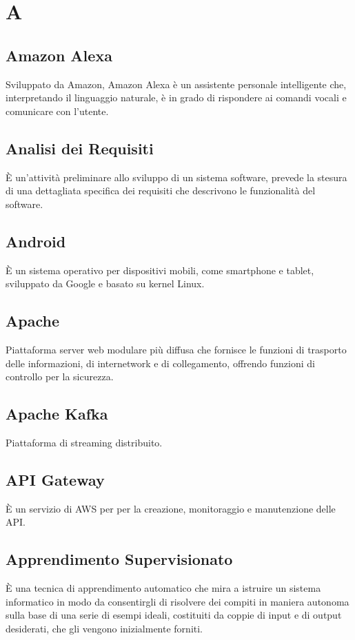 \section*{A}

\subsection{Amazon Alexa}
Sviluppato da Amazon, Amazon Alexa è un assistente personale intelligente che, interpretando il linguaggio naturale, è in grado di rispondere ai comandi vocali e comunicare con l'utente. 

\subsection{Analisi dei Requisiti}
È un'attività preliminare allo sviluppo di un sistema software, prevede la stesura di una dettagliata specifica dei requisiti che descrivono le funzionalità del software.

\subsection{Android}
È un sistema operativo per dispositivi mobili, come smartphone e tablet, sviluppato da Google e basato su kernel Linux.

\subsection{Apache}
Piattaforma server web modulare più diffusa che fornisce le funzioni di trasporto delle informazioni, di internetwork e di collegamento, offrendo funzioni di controllo per la sicurezza.

\subsection{Apache Kafka}
Piattaforma di streaming distribuito.

\subsection{API Gateway}
È un servizio di AWS per per la creazione, monitoraggio e manutenzione delle API.

\subsection{Apprendimento Supervisionato}
È una tecnica di apprendimento automatico che mira a istruire un sistema informatico in modo da consentirgli di risolvere dei compiti in maniera autonoma sulla base di una serie di esempi ideali, costituiti da coppie di input e di output desiderati, che gli vengono inizialmente forniti.

